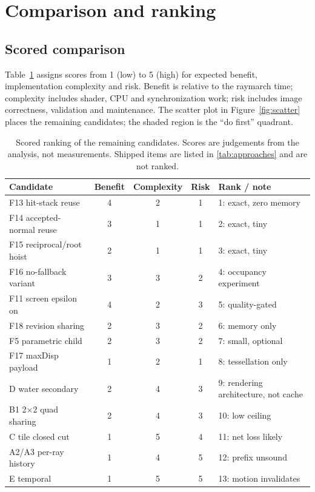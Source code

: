\documentclass[11pt,a4paper]{article}
\theoremstyle{plain}
\theoremstyle{definition}
\theoremstyle{remark}
\begin{document}
\section{Comparison and ranking}
\label{sec:ranking}

\subsection{Scored comparison}

Table~\ref{tab:scores} assigns scores from 1 (low) to 5 (high) for expected
benefit, implementation complexity and risk. Benefit is relative to the
raymarch time; complexity includes shader, CPU and synchronization work; risk
includes image correctness, validation and maintenance. The scatter plot in
Figure~\ref{fig:scatter} places the remaining candidates; the shaded region is
the ``do first'' quadrant.

\begin{table}[t]
\centering
\small
\caption{Scored ranking of the remaining candidates. Scores are judgements
from the analysis, not measurements. Shipped items are listed in
\cref{tab:approaches} and are not ranked.}
\label{tab:scores}
\begin{tabular}{@{}lcccl@{}}
\toprule
Candidate & Benefit & Complexity & Risk & Rank / note \\
\midrule
F13 hit-stack reuse & 4 & 2 & 1 & 1: exact, zero memory \\
F14 accepted-normal reuse & 3 & 1 & 1 & 2: exact, tiny \\
F15 reciprocal/root hoist & 2 & 1 & 1 & 3: exact, tiny \\
F16 no-fallback variant & 3 & 3 & 2 & 4: occupancy experiment \\
F11 screen epsilon on & 4 & 2 & 3 & 5: quality-gated \\
F18 revision sharing & 2 & 3 & 2 & 6: memory only \\
F5 parametric child & 2 & 3 & 2 & 7: small, optional \\
F17 maxDisp payload & 1 & 2 & 1 & 8: tessellation only \\
D water secondary & 2 & 4 & 3 & 9: rendering architecture, not cache \\
B1 2$\times$2 quad sharing & 2 & 4 & 3 & 10: low ceiling \\
C tile closed cut & 1 & 5 & 4 & 11: net loss likely \\
A2/A3 per-ray history & 1 & 4 & 5 & 12: prefix unsound \\
E temporal & 1 & 5 & 5 & 13: motion invalidates \\
\bottomrule
\end{tabular}
\end{table}
\end{document}
